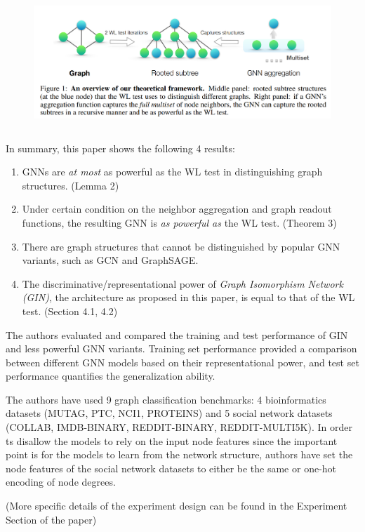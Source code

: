 \documentclass{article}
\begin{document}
\begin{figure}[hbt]
  \includegraphics[height=5cm]{Figure1.png}
  \centering
\end{figure}

In summary, this paper shows the following 4 results:
\begin{enumerate}
\item GNNs are \textit{at most} as powerful as the WL test in distinguishing graph structures. (Lemma 2)
\item Under certain condition on the neighbor aggregation and graph readout functions, the resulting GNN is \textit{as powerful as} the WL test. (Theorem 3)
\item There are graph structures that cannot be distinguished by popular GNN variants, such as GCN and GraphSAGE.
\item The discriminative/representational power of \textit{Graph Isomorphism Network (GIN)}, the architecture as proposed in this paper, is equal to that of the WL test. (Section 4.1, 4.2)
\end{enumerate}

The authors evaluated and compared the training and test performance of GIN and less powerful GNN variants.
Training set performance provided a comparison between different GNN models based on their representational power, and test set performance quantifies the generalization ability.

The authors have used 9 graph classification benchmarks: 4 bioinformatics datasets (MUTAG, PTC, NCI1, PROTEINS) and 5 social network datasets (COLLAB, IMDB-BINARY, REDDIT-BINARY, REDDIT-MULTI5K).
In order ts disallow the models to rely on the input node features since the important point is for the models to learn from the network structure, authors have set the node features of the social network datasets to either be the same or one-hot encoding of node degrees.

(More specific details of the experiment design can be found in the Experiment Section of the paper)
\end{document}
